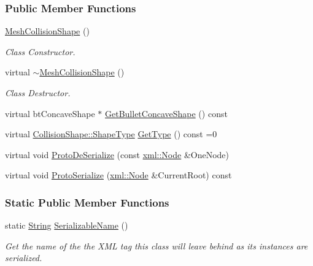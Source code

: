 \subsubsection*{Public Member Functions}
\begin{DoxyCompactItemize}
\item 
\hypertarget{classMezzanine_1_1MeshCollisionShape_a5d5424990596460bfa86774b31eceba1}{
\hyperlink{classMezzanine_1_1MeshCollisionShape_a5d5424990596460bfa86774b31eceba1}{MeshCollisionShape} ()}
\label{classMezzanine_1_1MeshCollisionShape_a5d5424990596460bfa86774b31eceba1}

\begin{DoxyCompactList}\small\item\em Class Constructor. \item\end{DoxyCompactList}\item 
\hypertarget{classMezzanine_1_1MeshCollisionShape_a7e0554bdd88471091de94a488d18264e}{
virtual \hyperlink{classMezzanine_1_1MeshCollisionShape_a7e0554bdd88471091de94a488d18264e}{$\sim$MeshCollisionShape} ()}
\label{classMezzanine_1_1MeshCollisionShape_a7e0554bdd88471091de94a488d18264e}

\begin{DoxyCompactList}\small\item\em Class Destructor. \item\end{DoxyCompactList}\item 
virtual btConcaveShape $\ast$ \hyperlink{classMezzanine_1_1MeshCollisionShape_a0a39875a6ca86c1a02c5432e04b80820}{GetBulletConcaveShape} () const 
\item 
virtual \hyperlink{classMezzanine_1_1CollisionShape_ad04186055565998879b64176d6dd100d}{CollisionShape::ShapeType} \hyperlink{classMezzanine_1_1MeshCollisionShape_a00dc444afac92030ea43815ec21dd8e8}{GetType} () const =0
\item 
virtual void \hyperlink{classMezzanine_1_1MeshCollisionShape_a7ca10a20691c768749668dfd28678d10}{ProtoDeSerialize} (const \hyperlink{classMezzanine_1_1xml_1_1Node}{xml::Node} \&OneNode)
\item 
virtual void \hyperlink{classMezzanine_1_1MeshCollisionShape_a96106c73da1be822f0889365c1e62c40}{ProtoSerialize} (\hyperlink{classMezzanine_1_1xml_1_1Node}{xml::Node} \&CurrentRoot) const 
\end{DoxyCompactItemize}
\subsubsection*{Static Public Member Functions}
\begin{DoxyCompactItemize}
\item 
static \hyperlink{namespaceMezzanine_acf9fcc130e6ebf08e3d8491aebcf1c86}{String} \hyperlink{classMezzanine_1_1MeshCollisionShape_a1b42e3a627e0fee56dbbaca9659e2883}{SerializableName} ()
\begin{DoxyCompactList}\small\item\em Get the name of the the XML tag this class will leave behind as its instances are serialized. \item\end{DoxyCompactList}\end{DoxyCompactItemize}
